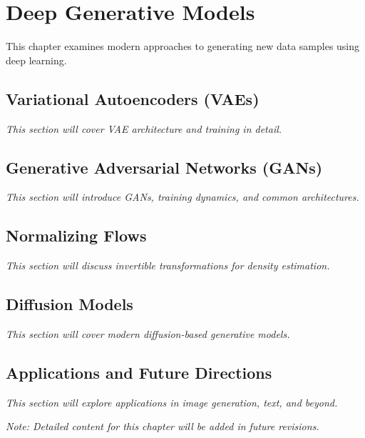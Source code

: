 
\chapter{Deep Generative Models}
\label{chap:deep-generative-models}

This chapter examines modern approaches to generating new data samples using deep learning.

\section{Variational Autoencoders (VAEs)}

\textit{This section will cover VAE architecture and training in detail.}

\section{Generative Adversarial Networks (GANs)}

\textit{This section will introduce GANs, training dynamics, and common architectures.}

\section{Normalizing Flows}

\textit{This section will discuss invertible transformations for density estimation.}

\section{Diffusion Models}

\textit{This section will cover modern diffusion-based generative models.}

\section{Applications and Future Directions}

\textit{This section will explore applications in image generation, text, and beyond.}

\vspace{1em}
\noindent\textit{Note: Detailed content for this chapter will be added in future revisions.}
